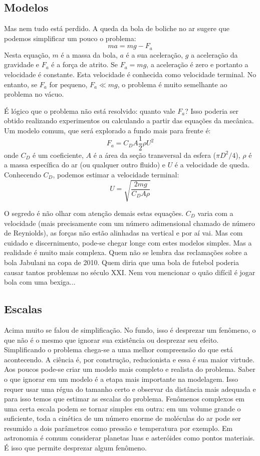\documentclass[article,12pt,oneside,a4paper,english,brazil,sumario=tradicional]{abntex2}
\begin{document}
\subsection{Modelos}

Mas nem tudo está perdido. A queda da bola de boliche no ar sugere que podemos simplificar um pouco o problema:
\[
m a = m g - F_a
\]
Nesta equação, $m$ é a massa da bola, $a$ é a sua aceleração, $g$ a aceleração da gravidade e $F_a$ é a força de atrito. Se $F_a = m g$, a aceleração é zero e portanto a velocidade é constante. Esta velocidade é conhecida como velocidade terminal. No entanto, se $F_a$ for pequeno, $F_a \ll mg$, o problema é muito semelhante ao problema no vácuo.

É lógico que o problema não está resolvido: quanto vale $F_a$? Isso poderia ser obtido realizando experimentos ou calculando a partir das equações da mecânica. Um modelo comum, que será explorado a fundo mais para frente é:
\[
F_a = C_D A \frac{1}{2}\rho U^2
\]
onde $C_D$ é um coeficiente, $A$ é a área da seção transversal da esfera ($\pi D^2 /4$), $\rho$ é a massa específica do ar (ou qualquer outro fluido) e $U$ é a velocidade de queda. Conhecendo $C_D$, podemos estimar a velocidade terminal:
\[
U = \sqrt{\frac{2 m g}{C_D A \rho}}
\]

O segredo é não olhar com atenção demais estas equações. $C_D$ varia com a velocidade (mais precisamente com um número adimensional chamado de número de Reyniolds), as forças não estão alinhadas na vertical e por aí vai. Mas com cuidado e discernimento, pode-se chegar longe com estes modelos simples. Mas a realidade é muito mais complexa. Quem não se lembra das reclamações sobre a bola Jabulani na copa de 2010. Quem diria que uma bola de futebol poderia causar tantos problemas no século XXI. Nem vou mencionar o quão difícil é jogar bola com uma bexiga...


\subsection{Escalas}

Acima muito se falou de simplificação. No fundo, isso é desprezar um fenômeno, o que não é o mesmo que ignorar sua existência ou desprezar seu efeito. Simplificando o problema chega-se a uma melhor compreensão do que está acontecendo. A ciência é, por construção, reducionista e essa é sua maior virtude. Aos poucos pode-se criar um modelo mais completo e realista do problema. Saber o que ignorar em um modelo é a etapa mais importante na modelagem. Isso requer usar uma régua do tamanho certo e observar da distância mais adequada e para isso temos que estimar as escalas do problema.  Fenômenos complexos em uma certa escala podem se tornar simples em outra: em um volume grande o suficiente, toda a cinética  de um número enorme de moléculas do ar pode ser resumido a dois parâmetros como pressão e temperatura por exemplo. Em astronomia é comum considerar planetas luas e asteróides como pontos materiais. É isso que permite desprezar algum fenômeno.
\end{document}
